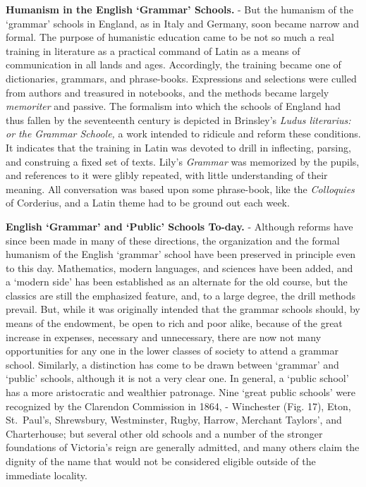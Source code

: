 \documentclass[]{book}
\begin{document}
\textbf{Humanism in the English `Grammar' Schools.} - But the humanism of the `grammar' schools in England, as in Italy and Germany, soon became narrow and formal. The purpose of humanistic education came to be not so much a real training in literature as a practical command of Latin as a means of communication in all lands and ages. Accordingly, the training became one of dictionaries, grammars, and phrase-books. Expressions and selections were culled from authors and treasured in notebooks, and the methods became largely \emph{memoriter} and passive. The formalism into which the schools of England had thus fallen by the seventeenth century is depicted in Brinsley's \emph{Ludus literarius: or the Grammar Schoole,} a work intended to ridicule and reform these conditions. It indicates that the training in Latin was devoted to drill in inflecting, parsing, and construing a fixed set of texts. Lily's \emph{Grammar} was memorized by the pupils, and references to it were glibly repeated, with little understanding of their meaning. All conversation was based upon some phrase-book, like the \emph{Colloquies} of Corderius, and a Latin theme had to be ground out each week.

\textbf{English `Grammar' and `Public' Schools To-day.} - Although reforms have since been made in many of these directions, the organization and the formal humanism of the English `grammar' school have been preserved in principle even to this day. Mathematics, modern languages, and sciences have been added, and a `modern side' has been established as an alternate for the old course, but the classics are still the emphasized feature, and, to a large degree, the drill methods prevail. But, while it was originally intended that the grammar schools should, by means of the endowment, be open to rich and poor alike, because of the great increase in expenses, necessary and unnecessary, there are now not many opportunities for any one in the lower classes of society to attend a grammar school. Similarly, a distinction has come to be drawn between `grammar' and `public' schools, although it is not a very clear one. In general, a `public school' has a more aristocratic and wealthier patronage. Nine `great public schools' were recognized by the Clarendon Commission in 1864, - Winchester (Fig. 17), Eton, St.~Paul's, Shrewsbury, Westminster, Rugby, Harrow, Merchant Taylors', and Charterhouse; but several other old schools and a number of the stronger foundations of Victoria's reign are generally admitted, and many others claim the dignity of the name that would not be considered eligible outside of the immediate locality.
\end{document}
